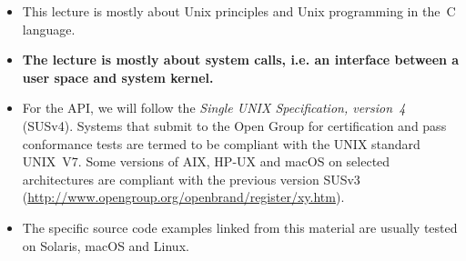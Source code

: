 \documentclass[article]{seminar}
\newcommand{\sltitle}[1]{{\centering\textbf{\Large #1}
    \vskip 2em plus 0pt minus 2em\par}} %
\newcommand{\emsl}[1]{\textbf{#1}} %
\newcounter{topicval}
\newcommand{\slidecontents}[1]{%
  \setcounter{topicval}{#1}%
  \begin{itemize}
  \topic{1}{Introduction, Unix and C, programming tools}
  \topic{2}{Basic Unix concepts and conventions, its API}
  \topic{3}{Access rights, devices}
  \topic{4}{Process manipulation, program execution}
  \topic{5}{Signals}
  \topic{6}{Process synchronization and interprocess communication}
  \topic{7}{Network programming}
  \topic{8}{Programming with threads}
  \topic{9}{Appendix}
  \end{itemize}%
}
\newcommand{\topic}[2]{%
  \item\relax
  \ifnum #1=\value{topicval}%
    \textbf{#2}%
  \else
    #2%
  \fi
}
\begin{document}
\pagebreak


\begin{itemize}
\item This lecture is mostly about Unix principles and Unix programming in the~C
language.
\item \emsl{The lecture is mostly about system calls, i.e. an interface between a
user space and system kernel.}
\item For the API, we will follow the \emph{Single UNIX Specification,
version~4} (SUSv4). Systems that submit to the Open Group for certification and
pass conformance tests are termed to be compliant with the UNIX standard
UNIX~V7.  Some versions of AIX, HP-UX and macOS on selected architectures
are compliant with the previous version SUSv3
(\url{http://www.opengroup.org/openbrand/register/xy.htm}).
\item The specific source code examples linked from this material are usually
tested on Solaris, macOS and Linux.
\end{itemize}




\end{document}
